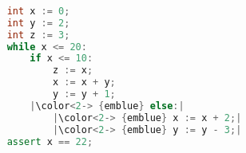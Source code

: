 \begin{lstlisting}[language=C++,basicstyle=\ttfamily,keywordstyle=\color{blue}, escapechar={|}]  % Start your code-block
	
	int x := 0;
	int y := 2;
	int z := 3;
	while x <= 20:
		if x <= 10:
			z := x;
			x := x + y;
			y := y + 1;
		|\color<2-> {emblue} else:|
			|\color<2-> {emblue} x := x + 2;|
			|\color<2-> {emblue} y := y - 3;|
	assert x == 22;
	\end{lstlisting}